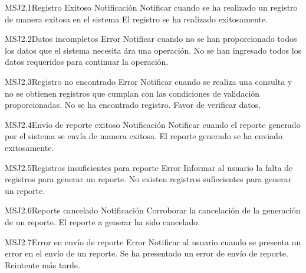 

\begin{Message}{MSJ2.1}{Registro Exitoso}
	\MSGitem[Tipo:] Notificación	
	\MSGitem[Objetivo: ] Notificar cuando se ha realizado un registro de manera exitosa en el sistema
	\MSGitem[Redacción: ] El registro se ha realizado exitosamente.
\end{Message}

\begin{Message}{MSJ2.2}{Datos incompletos}
	\MSGitem[Tipo:] Error	
	\MSGitem[Objetivo: ] Notificar cuando no se han proporcionado todos los datos que el sistema necesita ára una operación.
	\MSGitem[Redacción: ] No se han ingresado todos los datos requeridos para continuar la operación.
\end{Message}

\begin{Message}{MSJ2.3}{Registro no encontrado}
	\MSGitem[Tipo:] Error	
	\MSGitem[Objetivo: ] Notificar cuando se realiza una consulta y no se obtienen registros que cumplan con las condiciones de validación proporcionadas.
	\MSGitem[Redacción: ] No se ha encontrado registro. Favor de verificar datos.
\end{Message}

\begin{Message}{MSJ2.4}{Envío de reporte exitoso}
	\MSGitem[Tipo:] Notificación
	\MSGitem[Objetivo: ] Notificar cuando el reporte generado por el sistema se envía de manera exitosa.
	\MSGitem[Redacción: ] El reporte generado se ha enviado exitosamente.
\end{Message}

\begin{Message}{MSJ2.5}{Registros insuficientes para reporte}
	\MSGitem[Tipo:] Error
	\MSGitem[Objetivo: ] Informar al usuario la falta de registros para generar un reporte.
	\MSGitem[Redacción: ] No existen registros sufiecientes para generar un reporte.
\end{Message}

\begin{Message}{MSJ2.6}{Reporte cancelado}
	\MSGitem[Tipo:] Notificación
	\MSGitem[Objetivo: ] Corroborar la cancelación de la generación de un reporte.
	\MSGitem[Redacción: ] El reporte a generar ha sido cancelado.
\end{Message}

\begin{Message}{MSJ2.7}{Error en envío de reporte}
	\MSGitem[Tipo:] Error
	\MSGitem[Objetivo: ] Notificar al usuario cuando se presenta un error en el envío de un reporte.
	\MSGitem[Redacción: ] Se ha presentado un error de envío de reporte. Reintente más tarde.
\end{Message}

